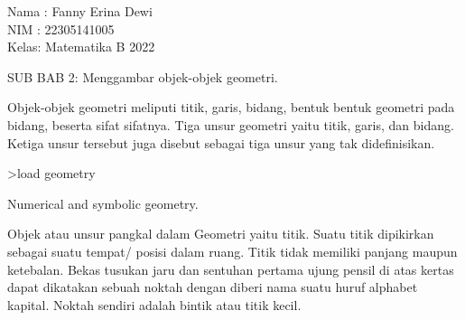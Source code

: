 \documentclass[a4paper,10pt]{article}
\begin{document}
\begin{eulernotebook}
\eulersubheading{}
\begin{eulercomment}
Nama : Fanny Erina Dewi\\
NIM  : 22305141005\\
Kelas: Matematika B 2022\\
\end{eulercomment}
\eulersubheading{}
\begin{eulercomment}
SUB BAB 2: Menggambar objek-objek geometri.

\begin{eulercomment}
\begin{eulercomment}
Objek-objek geometri meliputi titik, garis, bidang, bentuk bentuk
geometri pada bidang, beserta sifat sifatnya. Tiga unsur geometri
yaitu titik, garis, dan bidang. Ketiga unsur tersebut juga disebut
sebagai tiga unsur yang tak didefinisikan.

\end{eulercomment}
\begin{eulerprompt}
>load geometry
\end{eulerprompt}
\begin{euleroutput}
  Numerical and symbolic geometry.
\end{euleroutput}
\begin{eulercomment}
Objek atau unsur pangkal dalam Geometri yaitu titik. Suatu titik
dipikirkan sebagai suatu tempat/ posisi dalam ruang. Titik tidak
memiliki panjang maupun ketebalan. Bekas tusukan jaru dan sentuhan
pertama ujung pensil di atas kertas dapat dikatakan sebuah noktah
dengan diberi nama suatu huruf alphabet kapital. Noktah sendiri adalah
bintik atau titik kecil.



\end{eulercomment}
\end{eulercomment}
\end{eulercomment}
\end{eulernotebook}
\end{document}

